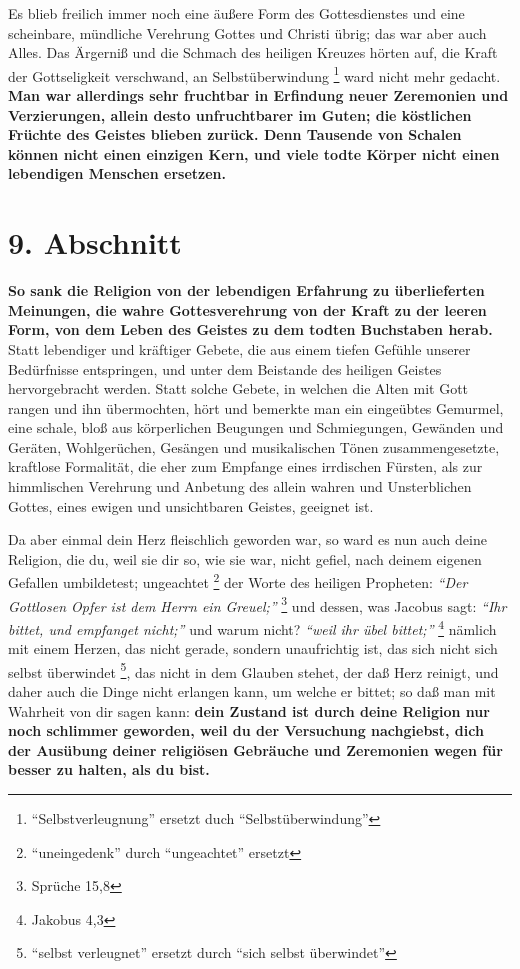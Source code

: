 \medskip 

Es blieb freilich immer noch eine äußere Form des Gottesdienstes und eine
scheinbare, mündliche Verehrung Gottes und Christi übrig; das war aber auch
Alles. Das Ärgerniß und die Schmach des heiligen Kreuzes hörten auf, die Kraft
der Gottseligkeit verschwand, an Selbstüberwindung
\footnote{"`Selbstverleugnung"' ersetzt duch "`Selbstüberwindung"'}
ward nicht mehr gedacht. \textbf{Man
war allerdings sehr fruchtbar in Erfindung neuer Zeremonien und Verzierungen,
allein desto unfruchtbarer im Guten; die köstlichen Früchte des Geistes blieben
zurück. Denn Tausende von Schalen können nicht einen einzigen Kern, und viele
todte Körper nicht einen lebendigen Menschen ersetzen.}

\section{9. Abschnitt}  \label{kap2_ab9}

\textbf{So sank die Religion von der lebendigen Erfahrung zu überlieferten
Meinungen,
die wahre Gottesverehrung von der Kraft zu der leeren Form, von dem Leben des
Geistes zu dem todten Buchstaben herab.} Statt lebendiger und kräftiger Gebete,
die aus einem tiefen Gefühle unserer Bedürfnisse entspringen, und unter dem
Beistande des heiligen Geistes hervorgebracht werden. Statt solche Gebete,
in welchen die Alten mit Gott rangen und ihn übermochten,
hört und bemerkte man ein
eingeübtes Gemurmel, eine schale, bloß aus körperlichen Beugungen und
Schmiegungen, Gewänden und Geräten, Wohlgerüchen, Gesängen und musikalischen
Tönen zusammengesetzte, kraftlose Formalität, die eher zum Empfange eines
irrdischen Fürsten, als zur himmlischen Verehrung und Anbetung des allein wahren
und Unsterblichen Gottes, eines ewigen und unsichtbaren Geistes, geeignet ist.

\medskip 

Da aber einmal dein Herz fleischlich geworden war, so ward es nun auch deine
Religion, die du, weil sie dir so, wie sie war, nicht gefiel, nach deinem
eigenen Gefallen umbildetest; ungeachtet \footnote{"`uneingedenk"' durch
"`ungeachtet"' ersetzt} der Worte des heiligen Propheten:
\textit{"`Der Gottlosen Opfer ist dem Herrn ein Greuel;"'}
\footnote{Sprüche 15,8}
 und
dessen, was Jacobus sagt:
\textit{"`Ihr bittet, und empfanget nicht;"'} und warum
nicht? \textit{"`weil ihr übel bittet;"'}
\footnote{Jakobus 4,3}
 nämlich mit einem
Herzen, das nicht gerade, sondern unaufrichtig ist, das sich nicht sich
selbst überwindet \footnote{"`selbst verleugnet"' ersetzt durch "`sich
selbst überwindet"'}, das nicht in dem Glauben stehet, der daß Herz reinigt,
und daher
auch die Dinge nicht erlangen kann, um welche er bittet; so daß man mit
Wahrheit von dir sagen kann: \textbf{dein Zustand ist durch deine Religion nur
noch
schlimmer geworden, weil du der Versuchung nachgiebst, dich der Ausübung
deiner religiösen Gebräuche und Zeremonien wegen für besser zu halten, als du
bist.}

